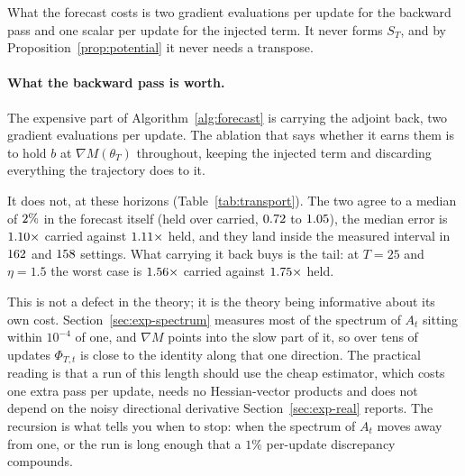 What the forecast costs is two gradient evaluations per update for the backward pass and one
scalar per update for the injected term. It never forms $S_T$, and by
Proposition~\ref{prop:potential} it never needs a transpose.

\paragraph{What the backward pass is worth.} The expensive part of
Algorithm~\ref{alg:forecast} is carrying the adjoint back, two gradient evaluations per update. The
ablation that says whether it earns them is to hold $b$ at $\nabla M(\theta_T)$ throughout, keeping
the injected term and discarding everything the trajectory does to it.

\begin{table}[t]
  \centering
  
  \caption{Forecast error with the adjoint carried back against held at $\nabla M$. Carrying it
  changes the forecast by a median of $\numTransportShiftPercent\%$ and buys only the worst case, and only where the run is
  long and the step large.}
  \label{tab:transport}
\end{table}

It does not, at these horizons (Table~\ref{tab:transport}). The two agree to a median of $\numTransportShiftPercent\%$ in
the forecast itself (held over carried, $0.72$ to $1.05$), the median error is $1.10\times$
carried against $1.11\times$ held, and they land inside the measured interval in
$162$ and $158$ settings. What carrying it back buys is the tail:
at $T=25$ and $\eta = 1.5$ the worst case is $1.56\times$ carried against
$1.75\times$ held.

This is not a defect in the theory; it is the theory being informative about its own cost.
Section~\ref{sec:exp-spectrum} measures most of the spectrum of $A_t$ sitting within $10^{-4}$ of
one, and $\nabla M$ points into the slow part of it, so over tens of updates $\Phi_{T,t}$ is close
to the identity along that one direction. The practical reading is that a run of this length should
use the cheap estimator, which costs one extra pass per update, needs no Hessian-vector products
and does not depend on the noisy directional derivative Section~\ref{sec:exp-real} reports. The
recursion is
what tells you when to stop: when the spectrum of $A_t$ moves away from one, or the run is long
enough that a $1\%$ per-update discrepancy compounds.

